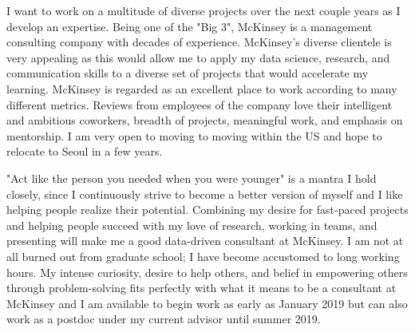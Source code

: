 \documentclass[11pt, letterpaper]{CV_latex_class}
\begin{document}
\begin{cvletter}

\hspace{1em} I want to work on a multitude of diverse projects over the next couple years as I develop an expertise. Being one of the "Big 3", McKinsey is a management consulting company with decades of experience. McKinsey's diverse clientele is very appealing as this would allow me to apply my data science, research, and communication skills to a diverse set of projects that would accelerate my learning. McKinsey is regarded as an excellent place to work according to many different metrics. Reviews from employees of the company love their intelligent and ambitious coworkers, breadth of projects, meaningful work, and emphasis on mentorship. I am very open to moving to moving within the US and hope to relocate to Seoul in a few years.



\hspace{1em} "Act like the person you needed when you were younger" is a mantra I hold closely, since I continuously strive to become a better version of myself and I like helping people realize their potential. Combining my desire for fast-paced projects and helping people succeed with my love of research, working in teams, and presenting will make me a good data-driven consultant at McKinsey. I am not at all burned out from graduate school; I have become accustomed to long working hours. My intense curiosity, desire to help others, and belief in empowering others through problem-solving fits perfectly with what it means to be a consultant at McKinsey and I am available to begin work as early as January 2019 but can also work as a postdoc under my current advisor until summer 2019.

\end{cvletter}


\makeletterclosing

\end{document}
